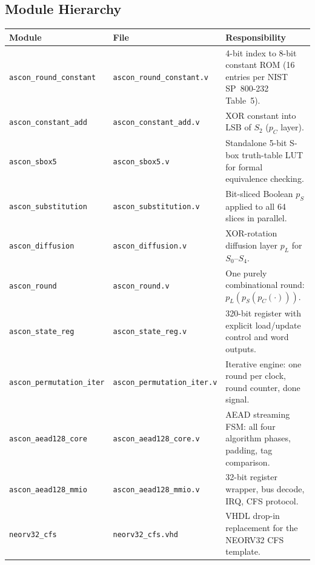 \documentclass[11pt,a4paper]{article}
\newcommand{\thead}[1]{\cellcolor{tabhead}\color{white}\textbf{\small #1}}
\begin{document}
\subsection{Module Hierarchy}

\begin{tabular}{@{}lL{4.5cm}L{7.5cm}@{}}
  \toprule
  \thead{Module} & \thead{File} & \thead{Responsibility} \\
  \midrule
  \texttt{ascon\_round\_constant}   & \texttt{ascon\_round\_constant.v}   &
    4-bit index to 8-bit constant ROM (16 entries per NIST SP~800-232 Table~5). \\
  \texttt{ascon\_constant\_add}     & \texttt{ascon\_constant\_add.v}     &
    XOR constant into LSB of $S_2$ ($p_C$ layer). \\
  \texttt{ascon\_sbox5}             & \texttt{ascon\_sbox5.v}             &
    Standalone 5-bit S-box truth-table LUT for formal equivalence checking. \\
  \texttt{ascon\_substitution}      & \texttt{ascon\_substitution.v}      &
    Bit-sliced Boolean $p_S$ applied to all 64 slices in parallel. \\
  \texttt{ascon\_diffusion}         & \texttt{ascon\_diffusion.v}         &
    XOR-rotation diffusion layer $p_L$ for $S_0$--$S_4$. \\
  \texttt{ascon\_round}             & \texttt{ascon\_round.v}             &
    One purely combinational round: $p_L(p_S(p_C(\cdot)))$. \\
  \texttt{ascon\_state\_reg}        & \texttt{ascon\_state\_reg.v}        &
    320-bit register with explicit load/update control and word outputs. \\
  \texttt{ascon\_permutation\_iter} & \texttt{ascon\_permutation\_iter.v} &
    Iterative engine: one round per clock, round counter, done signal. \\
  \texttt{ascon\_aead128\_core}     & \texttt{ascon\_aead128\_core.v}     &
    AEAD streaming FSM: all four algorithm phases, padding, tag comparison. \\
  \texttt{ascon\_aead128\_mmio}     & \texttt{ascon\_aead128\_mmio.v}     &
    32-bit register wrapper, bus decode, IRQ, CFS protocol. \\
  \texttt{neorv32\_cfs}             & \texttt{neorv32\_cfs.vhd}           &
    VHDL drop-in replacement for the NEORV32 CFS template. \\
  \bottomrule
\end{tabular}
\end{document}
